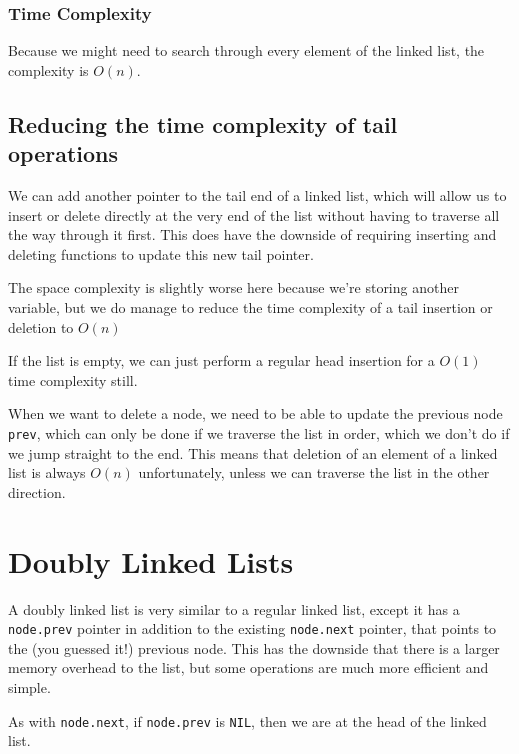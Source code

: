 \subsubsection{Time Complexity}\label{ssub:time_complexitysearchlinkedlist}

Because we might need to search through every element of the linked list, the complexity is \(O(n)\).

\subsection{Reducing the time complexity of tail operations}\label{sub:reducing_the_time_complexity_of_tail_operations}

We can add another pointer to the tail end of a linked list, which will allow us to insert or delete directly at the very end of the list without having to traverse all the way through it first.
This does have the downside of requiring inserting and deleting functions to update this new tail pointer.
\begin{note}
    The space complexity is slightly worse here because we're storing another variable, but we do manage to reduce the time complexity of a tail insertion or deletion to \(O(n)\)
\end{note}
\begin{note}
    If the list is empty, we can just perform a regular head insertion for a \(O(1)\) time complexity still.
\end{note}
When we want to delete a node, we need to be able to update the previous node \texttt{prev}, which can only be done if we traverse the list in order, which we don't do if we jump straight to the end.
This means that deletion of an element of a linked list is always \(O(n)\) unfortunately, unless we can traverse the list in the other direction.

\section{Doubly Linked Lists}\label{sec:doubly_linked_lists}

A doubly linked list is very similar to a regular linked list, except it has a \texttt{node.prev} pointer in addition to the existing \texttt{node.next} pointer, that points to the (you guessed it!) previous node.
This has the downside that there is a larger memory overhead to the list, but some operations are much more efficient and simple.
\begin{note}
    As with \texttt{node.next}, if \texttt{node.prev} is \texttt{NIL}, then we are at the head of the linked list.
\end{note}

